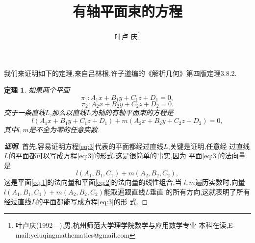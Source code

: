 \documentclass[a4paper]{article}
\newtheorem*{theo}{定理}
\newenvironment{theorem}
{\bigskip\begin{mdframed}\begin{theo}}
    {\end{theo}\end{mdframed}\bigskip}
\begin{document}
\title{\huge{\bf{有轴平面束的方程}}} \author{\small{叶卢
    庆\footnote{叶卢庆(1992---),男,杭州师范大学理学院数学与应用数学专业
      本科在读,E-mail:yeluqingmathematics@gmail.com}}}
\maketitle\ni
我们来证明如下的定理,来自吕林根,许子道编的《解析几何》第四版定理3.8.2.
\begin{theorem}
如果两个平面
\begin{equation}
  \label{eq:1}
  \pi_1:A_1x+B_1y+C_1z+D_1=0,
\end{equation}
\begin{equation}
  \label{eq:2}
  \pi_2:A_2x+B_2y+C_2z+D_2=0.
\end{equation}
交于一条直线$L$,那么以直线$L$为轴的有轴平面束的方程是
\begin{equation}
  \label{eq:3}
  l(A_1x+B_1y+C_1z+D_1)+m(A_2x+B_2y+C_2z+D_2)=0,
\end{equation}
其中$l,m$是不全为零的任意实数.
\end{theorem}
\begin{proof}[\textbf{证明}]
首先,容易证明方程\eqref{eq:3}代表的平面都经过直线$L$,关键是证明,任意经
过直线$L$的平面都可以写成方程\eqref{eq:3}的形式.这是很简单的事实,因为
平面\eqref{eq:3}的法向量是
$$
l(A_1,B_1,C_1)+m(A_2,B_2,C_2),
$$
这是平面\eqref{eq:1}的法向量和平面\eqref{eq:2}的法向量的线性组合,当
$l,m$遍历实数时,向量$l(A_1,B_1,C_1)+m(A_2,B_2,C_2)$能取遍跟直线$L$垂直
的所有方向,这就表明了所有经过直线$L$的平面都能写成方程\eqref{eq:3}的形
式.
\end{proof}
\end{document}

